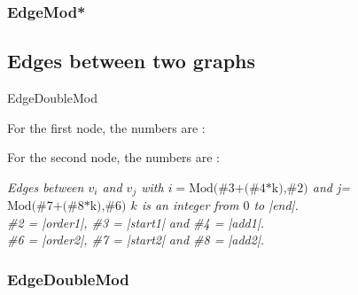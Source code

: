 \subsubsection{EdgeMod* }%
\begin{center}
\begin{tkzexample}[vbox] 
\end{tkzexample}
\end{center}

\newpage  
\subsection{Edges between two graphs }%
\begin{NewMacroBox}{EdgeDoubleMod}{}

For the first node,  the numbers are :

\medskip  
For the second node,  the numbers are :  
  
\medskip
\emph{Edges between $v_i$ and $v_j$ with $i=\text{Mod(\#3+(\#4*k),\#2)}$ and j=$\text{Mod(\#7+(\#8*k),\#6)}$ $k$ is an integer from $0$ to |end|.\\
\#2 = |order1|,  \#3 = |start1| and \#4 = |add1|.\\
\#6 = |order2|,  \#7 = |start2| and \#8 = |add2|.}
\end{NewMacroBox} 


\subsubsection{EdgeDoubleMod}
\begin{center}
\begin{tkzexample}[vbox]
\end{tkzexample}
\end{center}



